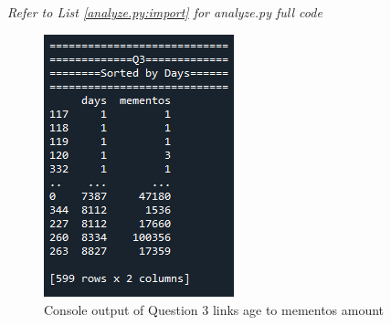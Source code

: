 \documentclass[12pt]{article}
\begin{document}
\subsection*{\color{blue}{Answer}}
\emph{Refer to List 
\ref{analyze.py:import} for analyze.py full code}
\begin{figure}[H]
    \centering
    \includegraphics[trim=0 0 0 0, clip, width=\textwidth] {q3b.PNG}
    \caption{Console output of Question 3 links age to mementos amount}
    \label{fig:Q3bAns}
\end{figure}
\end{document}

